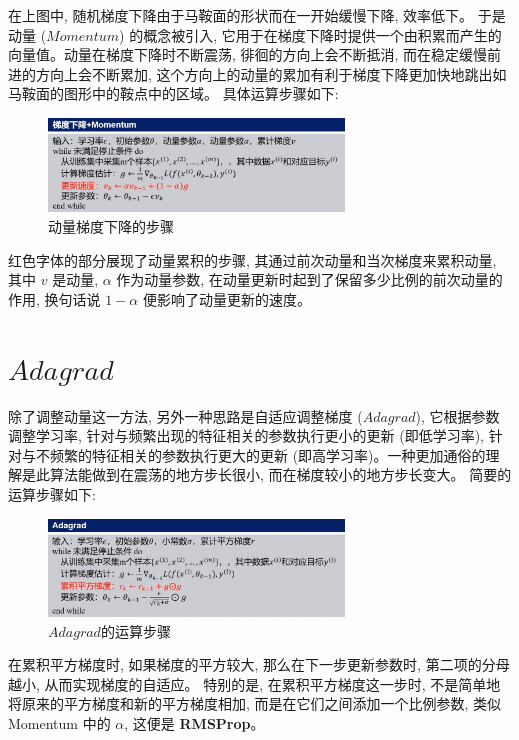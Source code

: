 \documentclass[printMode=true, declarePage=false]{ecnuthesis}
\begin{document}
    在上图中, 随机梯度下降由于马鞍面的形状而在一开始缓慢下降, 效率低下。
    于是动量 ($Momentum$) 的概念被引入, 它用于在梯度下降时提供一个由积累而产生的向量值。动量在梯度下降时不断震荡, 徘徊的方向上会不断抵消, 而在稳定缓慢前进的方向上会不断累加, 这个方向上的动量的累加有利于梯度下降更加快地跳出如马鞍面的图形中的鞍点中的区域。
    具体运算步骤如下:

    \begin{figure}[H]
        \centering
        \includegraphics[width=0.7\textwidth]{../lectures/img/gd-with-momentum.jpg}
        \caption{动量梯度下降的步骤}
    \end{figure}

    红色字体的部分展现了动量累积的步骤, 其通过前次动量和当次梯度来累积动量, 其中 \( v \) 是动量, \( \alpha \) 作为动量参数, 在动量更新时起到了保留多少比例的前次动量的作用, 换句话说 \( 1 - \alpha \) 便影响了动量更新的速度。


    \section{$Adagrad$}

    除了调整动量这一方法, 另外一种思路是自适应调整梯度 ($Adagrad$), 它根据参数调整学习率, 针对与频繁出现的特征相关的参数执行更小的更新 (即低学习率), 针对与不频繁的特征相关的参数执行更大的更新 (即高学习率)。一种更加通俗的理解是此算法能做到在震荡的地方步长很小, 而在梯度较小的地方步长变大。
    简要的运算步骤如下:

    \begin{figure}[H]
        \centering
        \includegraphics[width=0.7\textwidth]{../lectures/img/adagrad-steps.png}
        \caption{$Adagrad$的运算步骤}
    \end{figure}

    在累积平方梯度时, 如果梯度的平方较大, 那么在下一步更新参数时, 第二项的分母越小, 从而实现梯度的自适应。
    特别的是, 在累积平方梯度这一步时, 不是简单地将原来的平方梯度和新的平方梯度相加, 而是在它们之间添加一个比例参数, 类似 Momentum 中的 \( \alpha \), 这便是 \textbf{RMSProp}。
\end{document}
